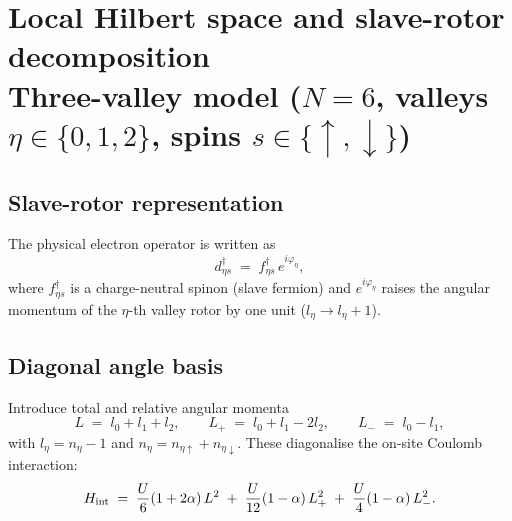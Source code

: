 \documentclass[11pt,a4paper]{article}
\newcommand{\ua}{\uparrow}
\newcommand{\da}{\downarrow}
\begin{document}
\section*{Local Hilbert space and slave-rotor decomposition\\[4pt]
          \large Three-valley model ($N=6$, valleys $\eta\in\{0,1,2\}$,
          spins $s\in\{\ua,\da\}$)}

\subsection*{Slave-rotor representation}

The physical electron operator is written as
\begin{equation}
  d^{\dagger}_{\eta s}
  \;=\;
  f^{\dagger}_{\eta s}\,e^{i\varphi_\eta},
  \label{eq:slaverot}
\end{equation}
where $f^{\dagger}_{\eta s}$ is a charge-neutral spinon (slave fermion) and
$e^{i\varphi_\eta}$ raises the angular momentum of the $\eta$-th valley rotor
by one unit ($l_\eta\to l_\eta+1$).

\subsection*{Diagonal angle basis}

Introduce total and relative angular momenta
\begin{equation}
  L \;=\; l_0+l_1+l_2, \qquad
  L_+ \;=\; l_0+l_1-2l_2, \qquad
  L_- \;=\; l_0-l_1,
  \label{eq:Lbasis}
\end{equation}
with $l_\eta = n_\eta - 1$ and $n_\eta = n_{\eta\ua}+n_{\eta\da}$.
These diagonalise the on-site Coulomb interaction:
\begin{equation}
  H_{\rm int}
  \;=\;
  \frac{U}{6}(1+2\alpha)\,L^2
  \;+\;
  \frac{U}{12}(1-\alpha)\,L_+^2
  \;+\;
  \frac{U}{4}(1-\alpha)\,L_-^2.
\end{equation}
\end{document}
